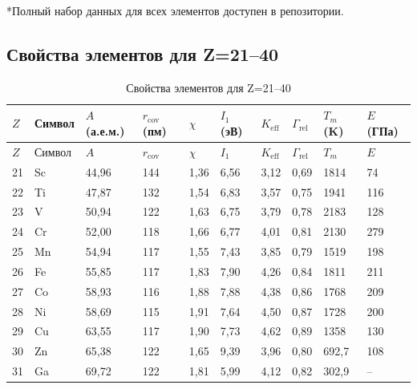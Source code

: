 \documentclass[12pt,a4paper]{article}
\newcommand{\Keff}{K_{\mathrm{eff}}}
\begin{document}
	\vspace{0.2cm}
	*Полный набор данных для всех элементов доступен в репозитории.
	
	\subsection*{Свойства элементов для Z=21–40}
	
	\begin{longtable}{p{0.6cm}p{1.2cm}p{1.2cm}p{1.2cm}p{1.2cm}p{1.2cm}p{1.5cm}p{1.2cm}p{1.2cm}p{1.2cm}}
		\caption{Свойства элементов для Z=21–40} \label{tab:elem-data-21to40} \\
		\toprule
		\(Z\) & Символ & \(A\) (а.е.м.) & \(r_{\text{cov}}\) (пм) & \(\chi\) & \(I_1\) (эВ) & \(\Keff\) & \(\Gamma_{\text{rel}}\) & \(T_m\) (K) & \(E\) (ГПа) \\
		\midrule
		\endfirsthead
		\toprule
		\(Z\) & Символ & \(A\) & \(r_{\text{cov}}\) & \(\chi\) & \(I_1\) & \(\Keff\) & \(\Gamma_{\text{rel}}\) & \(T_m\) & \(E\) \\
		\midrule
		\endhead
		21 & Sc & 44,96 & 144 & 1,36 & 6,56 & 3,12 & 0,69 & 1814 & 74 \\
		22 & Ti & 47,87 & 132 & 1,54 & 6,83 & 3,57 & 0,75 & 1941 & 116 \\
		23 & V  & 50,94 & 122 & 1,63 & 6,75 & 3,79 & 0,78 & 2183 & 128 \\
		24 & Cr & 52,00 & 118 & 1,66 & 6,77 & 4,01 & 0,81 & 2130 & 279 \\
		25 & Mn & 54,94 & 117 & 1,55 & 7,43 & 3,85 & 0,79 & 1519 & 198 \\
		26 & Fe & 55,85 & 117 & 1,83 & 7,90 & 4,26 & 0,84 & 1811 & 211 \\
		27 & Co & 58,93 & 116 & 1,88 & 7,88 & 4,38 & 0,86 & 1768 & 209 \\
		28 & Ni & 58,69 & 115 & 1,91 & 7,64 & 4,50 & 0,87 & 1728 & 200 \\
		29 & Cu & 63,55 & 117 & 1,90 & 7,73 & 4,62 & 0,89 & 1358 & 130 \\
		30 & Zn & 65,38 & 122 & 1,65 & 9,39 & 3,96 & 0,80 & 692,7 & 108 \\
		31 & Ga & 69,72 & 122 & 1,81 & 5,99 & 4,12 & 0,82 & 302,9 & – \\

\end{longtable}
\end{document}
